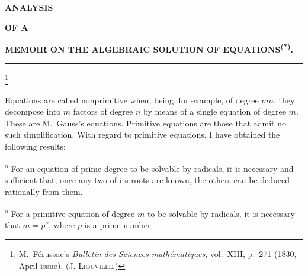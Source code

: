 
\providecommand{\GalSourcePageStart}[4]{}%
\providecommand{\GalSourcePageBoundary}[4]{\space}%
\providecommand{\GalSourceError}[2]{#1}%
\providecommand{\GalHistoricalFootnote}[1]{\footnote{#1}}%
\providecommand{\GalArticleEndRule}{\par\smallskip\begin{center}\rule{0.18\linewidth}{0.4pt}\end{center}}%
\providecommand{\GalOrdinal}[1]{#1\textsuperscript{o}}%

\GalSourcePageStart{040}{L0039}{11}{11}

\begin{center}
{\Large\bfseries ANALYSIS\par}
\vspace{0.2em}
{\scriptsize\bfseries OF A\par}
\vspace{0.2em}
{\normalsize\bfseries MEMOIR ON THE ALGEBRAIC SOLUTION OF EQUATIONS\textsuperscript{(*)}.\par}
\vspace{0.75em}
\rule{0.12\linewidth}{0.4pt}
\end{center}

\GalHistoricalFootnote{M.~Férussac's \emph{Bulletin des Sciences mathématiques}, vol.~XIII, p.~271
(1830, April issue). \textsc{(J. Liouville.)}}

Equations are called nonprimitive when, being, for example, of
degree $mn$, they decompose into $m$ factors of degree $n$ by means
of a single equation of degree $m$. These are M.~Gauss's equations.
Primitive equations are those that admit no such simplification. With
regard to primitive equations, I have obtained the following results:

\medskip
\noindent\GalOrdinal{1} For an equation of prime degree to be solvable by
radicals, it is necessary and sufficient that, once any two of its roots
are known, the others can be deduced rationally from them.

\smallskip
\noindent\GalOrdinal{2} For a primitive equation of degree $m$ to be solvable
by radicals, it is necessary that $m=p^{\nu}$, where $p$ is a prime number.


